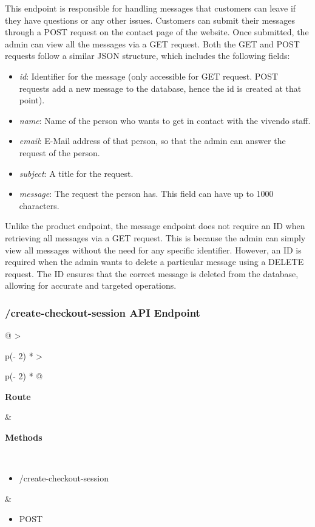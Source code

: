 This endpoint is responsible for handling messages that customers can leave if they have questions or any other issues. Customers can submit their messages through a POST request on the contact page of the website. Once submitted, the admin can view all the messages via a GET request. Both the GET and POST requests follow a similar JSON structure, which includes the following fields:

\begin{itemize}
    \item \textit{id}: Identifier for the message (only accessible for GET request. POST requests add a new message to the database, hence the id is created at that point).
    \item \textit{name}: Name of the person who wants to get in contact with the vivendo staff.
    \item \textit{email}: E-Mail address of that person, so that the admin can answer the request of the person.
    \item \textit{subject}: A title for the request.
    \item \textit{message}: The request the person has. This field can have up to 1000 characters.
\end{itemize}

Unlike the product endpoint, the message endpoint does not require an ID when retrieving all messages via a GET request. This is because the admin can simply view all messages without the need for any specific identifier. However, an ID is required when the admin wants to delete a particular message using a DELETE request. The ID ensures that the correct message is deleted from the database, allowing for accurate and targeted operations.

\subsubsection{/create-checkout-session API Endpoint}

\begin{longtable}[]{@{}
    >{\raggedright\arraybackslash}p{(\columnwidth - 2\tabcolsep) * }
    >{\raggedright\arraybackslash}p{(\columnwidth - 2\tabcolsep) * }@{}}
\toprule
\begin{minipage}[b]{\linewidth}\raggedright
\textbf{Route}
\end{minipage} & \begin{minipage}[b]{\linewidth}\raggedright
\textbf{Methods}
\end{minipage} \\
\midrule
\endhead
\begin{itemize}
    \item /create-checkout-session
\end{itemize} &
\begin{itemize}
    \item POST
\end{itemize} \\
\bottomrule
\end{longtable}

